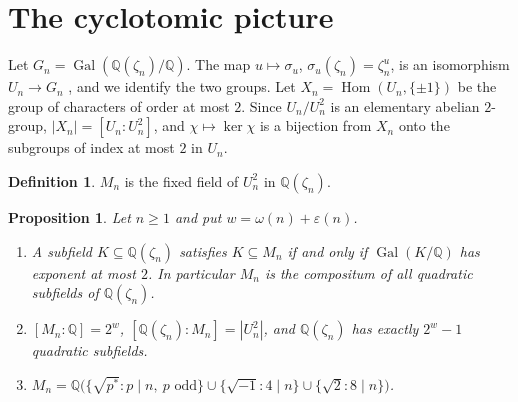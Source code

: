 \documentclass[11pt]{article}
\newtheorem{proposition}[theorem]{Proposition}
\theoremstyle{definition}
\newtheorem{definition}[theorem]{Definition}
\newcommand{\Q}{\mathbb{Q}}
\newcommand{\Hom}{\operatorname{Hom}}
\newcommand{\Gal}{\operatorname{Gal}}
\renewcommand{\epsilon}{\varepsilon}
\begin{document}
\section{The cyclotomic picture}\label{sec:galois}

Let $G_n=\Gal(\Q(\zeta_n)/\Q)$. The map $u\mapsto\sigma_u$, $\sigma_u(\zeta_n)=\zeta_n^u$, is an isomorphism $U_n\to G_n$ \cite[Chapter~2]{Wash}, and we identify the two groups. Let $X_n=\Hom(U_n,\{\pm1\})$ be the group of characters of order at most $2$. Since $U_n/U_n^2$ is an elementary abelian $2$-group, $|X_n|=[U_n:U_n^2]$, and $\chi\mapsto\ker\chi$ is a bijection from $X_n$ onto the subgroups of index at most $2$ in $U_n$.

\begin{definition}\label{def:Mn}
$M_n$ is the fixed field of $U_n^2$ in $\Q(\zeta_n)$.
\end{definition}

\begin{proposition}\label{prop:Mn}
Let $n\ge1$ and put $w=\omega(n)+\epsilon(n)$.
\begin{enumerate}[label=\upshape(\roman*)]
\item A subfield $K\subseteq\Q(\zeta_n)$ satisfies $K\subseteq M_n$ if and only if $\Gal(K/\Q)$ has exponent at most $2$. In particular $M_n$ is the compositum of all quadratic subfields of $\Q(\zeta_n)$.
\item $[M_n:\Q]=2^{w}$, $[\Q(\zeta_n):M_n]=|U_n^2|$, and $\Q(\zeta_n)$ has exactly $2^{w}-1$ quadratic subfields.
\item $M_n=\Q\bigl(\{\sqrt{p^*}:p\mid n,\ p \text{ odd}\}\cup\{\sqrt{-1}:4\mid n\}\cup\{\sqrt2:8\mid n\}\bigr)$.
\end{enumerate}
\end{proposition}
\end{document}
